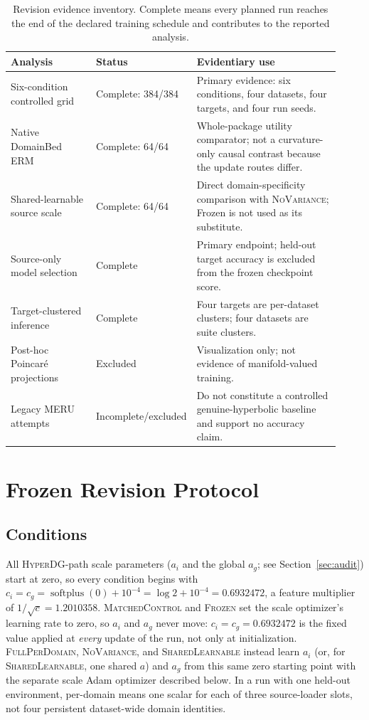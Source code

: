 \documentclass[10pt]{article}
\newcommand{\method}{\textsc{HyperDG}}
\newcommand{\full}{\textsc{FullPerDomain}}
\newcommand{\shared}{\textsc{SharedLearnable}}
\newcommand{\novar}{\textsc{NoVariance}}
\begin{document}
\begin{table}[H]
\centering
\caption{Revision evidence inventory. Complete means every planned run reaches
the end of the declared training schedule and contributes to the reported
analysis.}
\label{tab:evidence-status}
\small
\begin{tabular}{p{0.27\linewidth}p{0.18\linewidth}p{0.47\linewidth}}
\toprule
Analysis & Status & Evidentiary use \\
\midrule
Six-condition controlled grid & Complete: 384/384 & Primary evidence:
six conditions, four datasets, four targets, and four run seeds. \\
Native DomainBed ERM & Complete: 64/64 & Whole-package utility comparator;
not a curvature-only causal contrast because the update routes differ. \\
Shared-learnable source scale & Complete: 64/64 & Direct domain-specificity
comparison with \novar{}; Frozen is not used as its substitute. \\
Source-only model selection & Complete & Primary endpoint; held-out target
accuracy is excluded from the frozen checkpoint score. \\
Target-clustered inference & Complete & Four targets are per-dataset clusters;
four datasets are suite clusters. \\
Post-hoc Poincar\'e projections & Excluded & Visualization only; not evidence
of manifold-valued training. \\
Legacy MERU attempts & Incomplete/excluded & Do not constitute a controlled
genuine-hyperbolic baseline and support no accuracy claim. \\
\bottomrule
\end{tabular}
\end{table}

\section{Frozen Revision Protocol}
\label{sec:protocol}

\subsection{Conditions}

All \method{}-path scale parameters ($a_i$ and the global $a_g$; see
Section~\ref{sec:audit}) start at zero, so every condition begins with
$c_i=c_g=\operatorname{softplus}(0)+10^{-4}=\log2+10^{-4}=0.6932472$, a feature
multiplier of $1/\sqrt{c}=1.2010358$. \textsc{MatchedControl} and
\textsc{Frozen} set the scale optimizer's learning rate to zero, so $a_i$ and
$a_g$ never move: $c_i=c_g=0.6932472$ is the fixed value applied at
\emph{every} update of the run, not only at initialization. \full{},
\novar{}, and \shared{} instead learn $a_i$ (or, for \shared{}, one shared
$a$) and $a_g$ from this same zero starting point with the separate scale
Adam optimizer described below. In a run with one held-out environment,
per-domain means one scalar for each of three source-loader slots, not four
persistent dataset-wide domain identities.
\end{document}
